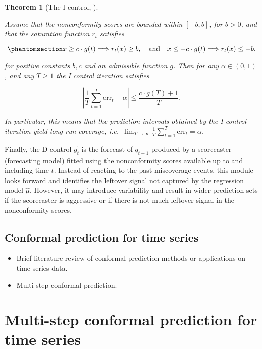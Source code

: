 \documentclass[
  11pt,
  a4paper,
]{article}
\theoremstyle{plain}
\newtheorem{theorem}{Theorem}[section]
\theoremstyle{plain}
\theoremstyle{remark}
\begin{document}
\begin{theorem}[The I control,
\textcite{angelopoulos2024}]\protect\hypertarget{thm-pid_i}{}\label{thm-pid_i}

Assume that the nonconformity scores are bounded within \([-b, b]\), for
\(b>0\), and that the saturation function \(r_t\) satisfies

\begin{equation}\phantomsection\label{eq-saturation}{
x \geq c \cdot g(t) \Longrightarrow r_t(x) \geq b, \quad \text {and} \quad x \leq-c \cdot g(t) \Longrightarrow r_t(x) \leq -b,
}\end{equation}

for positive constants \(b, c\) and an admissible function \(g\). Then
for any \(\alpha \in (0,1)\), and any \(T \geq 1\) the I control
iteration satisfies

\[
|\frac{1}{T}\sum_{t=1}^{T}\mathrm{err}_t - \alpha| \leq \frac{c \cdot g(T)+1}{T}.
\]

In particular, this means that the prediction intervals obtained by the
I control iteration yield long-run coverage,
i.e.~\(\lim _{T \rightarrow \infty} \frac{1}{T} \sum_{t=1}^T \mathrm{err}_t = \alpha\).

\end{theorem}

Finally, the D control \(g_t^{\prime}\) is the forecast of \(q_{t+1}\)
produced by a scorecaster (forecasting model) fitted using the
nonconformity scores available up to and including time \(t\). Instead
of reacting to the past miscoverage events, this module looks forward
and identifies the leftover signal not captured by the regression model
\(\hat{\mu}\). However, it may introduce variability and result in wider
prediction sets if the scorecaster is aggressive or if there is not much
leftover signal in the nonconformity scores.

\subsection{Conformal prediction for time series}\label{sec-review_ts}

\begin{itemize}
\item
  Brief literature review of conformal prediction methods or
  applications on time series data.
\item
  Multi-step conformal prediction.
\end{itemize}

\section{Multi-step conformal prediction for time
series}\label{sec-method}
\end{document}
